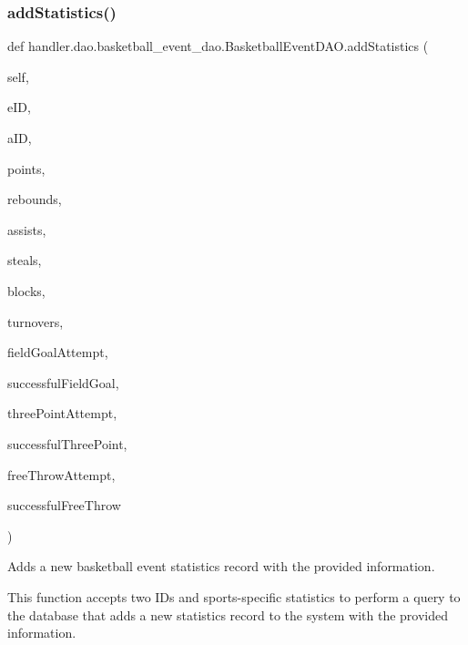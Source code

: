 \subsubsection{\texorpdfstring{add\+Statistics()}{addStatistics()}}
{\footnotesize\ttfamily def handler.\+dao.\+basketball\+\_\+event\+\_\+dao.\+Basketball\+Event\+D\+A\+O.\+add\+Statistics (\begin{DoxyParamCaption}\item[{}]{self,  }\item[{}]{e\+ID,  }\item[{}]{a\+ID,  }\item[{}]{points,  }\item[{}]{rebounds,  }\item[{}]{assists,  }\item[{}]{steals,  }\item[{}]{blocks,  }\item[{}]{turnovers,  }\item[{}]{field\+Goal\+Attempt,  }\item[{}]{successful\+Field\+Goal,  }\item[{}]{three\+Point\+Attempt,  }\item[{}]{successful\+Three\+Point,  }\item[{}]{free\+Throw\+Attempt,  }\item[{}]{successful\+Free\+Throw }\end{DoxyParamCaption})}



Adds a new basketball event statistics record with the provided information. 

This function accepts two I\+Ds and sports-\/specific statistics to perform a query to the database that adds a new statistics record to the system with the provided information.


